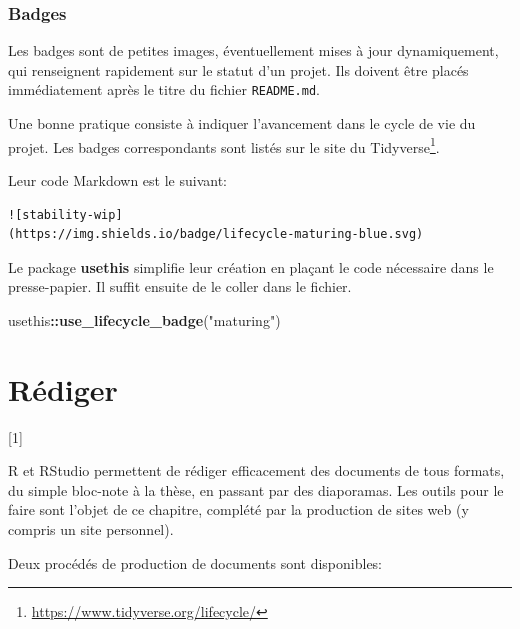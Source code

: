 \documentclass[
  12pt,
  french,
  a4paper,
  extrafontsizes,onecolumn,openright
  ]{memoir}
\newenvironment{Shaded}{\begin{snugshade}}{\end{snugshade}}
\newcommand{\FunctionTok}[1]{\textcolor[rgb]{0.13,0.29,0.53}{\textbf{#1}}}
\newcommand{\NormalTok}[1]{#1}
\newcommand{\SpecialCharTok}[1]{\textcolor[rgb]{0.81,0.36,0.00}{\textbf{#1}}}
\newcommand{\StringTok}[1]{\textcolor[rgb]{0.31,0.60,0.02}{#1}}
\newcommand{\toc}[1]{%
  \startcontents[chapters]%
  \printcontents[chapters]{}{1}[#1]{}%
  ~\newline%
}
\begin{document}
\subsection{Badges}\label{badges}

Les badges sont de petites images, éventuellement mises à jour dynamiquement, qui renseignent rapidement sur le statut d'un projet.
Ils doivent être placés immédiatement après le titre du fichier \texttt{README.md}.

Une bonne pratique consiste à indiquer l'avancement dans le cycle de vie du projet.
Les badges correspondants sont listés sur le site du Tidyverse\footnote{\url{https://www.tidyverse.org/lifecycle/}}.

Leur code Markdown est le suivant:

\begin{verbatim}
![stability-wip]
(https://img.shields.io/badge/lifecycle-maturing-blue.svg)
\end{verbatim}

Le package \textbf{usethis} simplifie leur création en plaçant le code nécessaire dans le presse-papier.
Il suffit ensuite de le coller dans le fichier.

\scriptsize

\begin{Shaded}
\begin{Highlighting}[]
\NormalTok{usethis}\SpecialCharTok{::}\FunctionTok{use\_lifecycle\_badge}\NormalTok{(}\StringTok{"maturing"}\NormalTok{)}
\end{Highlighting}
\end{Shaded}

\normalsize

\chapter{Rédiger}\label{chap-rediger}

\toc{1}

R et RStudio permettent de rédiger efficacement des documents de tous formats, du simple bloc-note à la thèse, en passant par des diaporamas.
Les outils pour le faire sont l'objet de ce chapitre, complété par la production de sites web (y compris un site personnel).

Deux procédés de production de documents sont disponibles:
\end{document}
